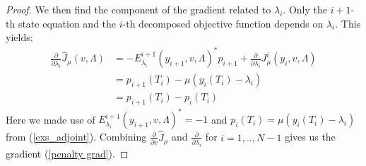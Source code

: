 \begin{proof}
We then find the component of the gradient related to $\lambda_i$. Only the $i+1$-th state equation and the $i$-th decomposed objective function depends on $\lambda_i$. This yields:
\begin{align*}
\frac{\partial}{\partial \lambda_i} \hat J_{\mu}(v,\Lambda) &= -E_{\lambda_i}^{i+1}(y_{i+1},v,\Lambda)^* p_{i+1} +  \frac{\partial}{\partial \lambda_i} J_{\mu}^i(y_i,v,\Lambda) \\
&= p_{i+1}(T_i)-\mu (y_{i}(T_i)-\lambda_i)\\
 &= p_{i+1}(T_i)-p_i(T_i)
\end{align*}
Here we made use of $E_{\lambda_i}^{i+1}(y_{i+1},v,\Lambda)^*=-1$ and $p_i(T_i)=\mu (y_{i}(T_i)-\lambda_i)$ from (\ref{exs_adjoint}). Combining $\frac{\partial}{\partial v} \hat J_{\mu}$ and $ \frac{\partial}{\partial \lambda_i}$ for $i=1,..,N-1$ gives us the gradient (\ref{penalty grad}).
\end{proof} 
